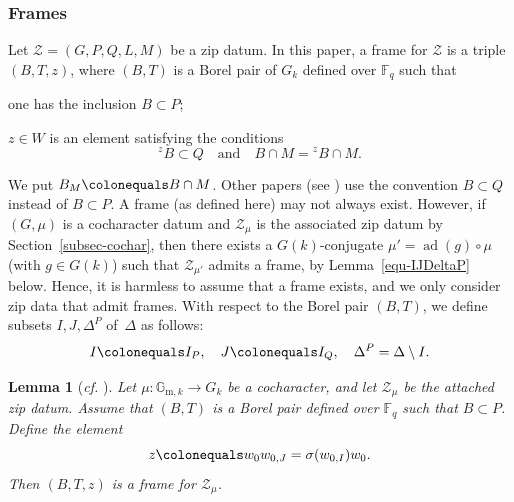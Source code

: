 \documentclass[10pt,a4paper]{article}
\numberwithin{equation}{section}
\newtheorem{lemma}[theorem]{Lemma}
\theoremstyle{definition}
\theoremstyle{remark}
\newcommand{\Zcal}{{\mathcal Z}}
\newcommand{\FF}{\mathbb{F}}
\newcommand{\GG}{\mathbb{G}}
\DeclareMathOperator{\ad}{ad}
\begin{document}
\subsubsection{Frames} \label{sec-frames}
Let $\Zcal=(G,P,Q,L,M)$ be a zip datum. In this paper, a frame for $\Zcal$ is a triple $(B,T,z)$, where $(B,T)$ is a Borel pair of $G_k$ defined over $\FF_q$ such that 
\begin{equivlist}
    \item one has the inclusion $B\subset P$; 
    \item $z\in W$ is an element satisfying the conditions
\begin{equation}\label{eqBorel}
{}^z \! B \subset Q \quad \textrm{and} \quad
 B\cap M= {}^z \! B\cap M. 
\end{equation}
\end{equivlist}
We put $B_M\colonequals B\cap M$. Other papers (see \cite{Pink-Wedhorn-Ziegler-zip-data,Pink-Wedhorn-Ziegler-F-Zips-additional-structure, Koskivirta-Wedhorn-Hasse}) use the convention $B\subset Q$ instead of $B\subset P$. A frame (as defined here) may not always exist. However, if $(G,\mu)$ is a cocharacter datum and $\Zcal_\mu$ is the associated zip datum by Section~\ref{subsec-cochar}, then there exists a $G(k)$-conjugate $\mu'=\ad(g)\circ \mu$ (with $g\in G(k)$) such that $\Zcal_{\mu'}$ admits a frame, by Lemma~\ref{equ-IJDeltaP} below. Hence, it is harmless to assume that a frame exists, and we only consider zip data that admit frames. With respect to the Borel pair $(B,T)$, we define subsets $I,J,\Delta^P $ of~$\Delta$ as follows:
\begin{equation}\label{equ-IJDeltaP}
 I \colonequals I_P, \quad J \colonequals I_Q, \quad \Delta^P=\Delta\setminus I.  
\end{equation}

\begin{lemma}[\textit{cf.} {\cite[Lemma 2.3.4]{Goldring-Koskivirta-zip-flags}}]\label{lem-framemu}
Let $\mu \colon \GG_{\mathrm{m},k}\to G_k$ be a cocharacter, and let $\Zcal_\mu$ be the attached zip datum. Assume that $(B,T)$ is a Borel pair defined over $\FF_q$ such that $B\subset P$. Define the element
\begin{equation}\label{z-def}
z \colonequals w_0 w_{0,J}=\sigma(w_{0,I})w_0.
\end{equation}
Then $(B,T,z)$ is a frame for $\Zcal_\mu$.
\end{lemma}
\end{document}
